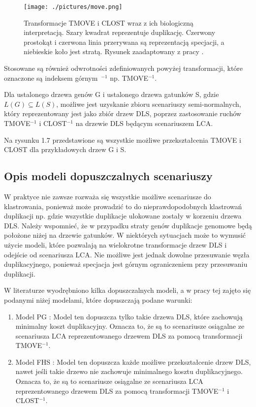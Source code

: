 \documentclass[licencjacka]{pracamgr}
\begin{document}
\begin{figure}[H]
  \centering
  \texttt{[image: ./pictures/move.png]}
  \caption{Transformacje TMOVE i CLOST wraz z ich biologiczną interpretacją. Szary  kwadrat reprezentuje duplikację. Czerwony prostokąt i czerwona linia przerywana są reprezentacją specjacji, a niebieskie koło jest stratą. Rysunek zaadaptowany z pracy \cite{dls}.}
\end{figure}



Stosowane są również odwrotności zdefiniowanych powyżej transformacji, które oznaczone są indeksem górnym~$^{-1}$ np. TMOVE$^{-1}$.

Dla ustalonego drzewa genów G i ustalonego drzewa gatunków S, gdzie $L(G) \subseteq L(S)$, możliwe jest uzyskanie zbioru scenariuszy semi-normalnych, który reprezentowany jest jako zbiór drzew DLS, poprzez zastosowanie ruchów TMOVE$^{-1}$ i CLOST$^{-1}$ na drzewie DLS będącym scenariuszem LCA. 

Na rysunku 1.7 przedstawione są wszystkie możliwe przekształcenia TMOVE i CLOST dla przykładowych drzew G i S.

\subsection{Opis modeli dopuszczalnych scenariuszy}

W praktyce nie zawsze rozważa się wszystkie możliwe scenariusze do klastrowania, ponieważ może prowadzić to do nieprawdopodobnych klastrowań duplikacji np. gdzie wszystkie duplikacje ulokowane zostały w korzeniu drzewa DLS. Należy wspomnieć, że w przypadku straty genów duplikacje genomowe będą położone niżej na drzewie gatunków. W niektórych sytuacjach może to wymusić użycie modeli, które pozwalają na wielokrotne transformacje drzew DLS i odejście od scenariusza LCA. Nie możliwe jest jednak dowolne przesuwanie węzła duplikacyjnego, ponieważ specjacja jest górnym ograniczeniem przy przesuwaniu duplikacji.

W literaturze wyodrębniono kilka dopuszczalnych modeli, a w pracy tej zajęto się podanymi niżej modelami, które dopuszczają podane warunki:
\begin{enumerate}
\item Model PG \cite{pg}: Model ten dopuszcza tylko takie drzewa DLS, które zachowują minimalny koszt duplikacyjny. Oznacza to, że są to scenariusze osiągalne ze scenariusza LCA reprezentowanego drzewem DLS za pomocą transformacji TMOVE$^{-1}$.
\item Model FHS \cite{Fellows}: Model ten dopuszcza każde możliwe przekształcenie drzew DLS, nawet jeśli takie drzewo nie zachowuje minimalnego kosztu duplikacyjnego. Oznacza to, że są to scenariusze osiągalne ze scenariusza LCA reprezentowanego drzewem DLS za pomocą transformacji TMOVE$^{-1}$ i CLOST$^{-1}$.
\end{enumerate}
\end{document}
